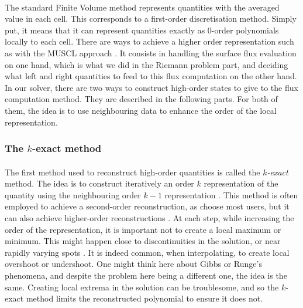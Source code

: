       \paragraph{}
      The standard Finite Volume method represents quantities with the averaged value in each cell.
      This corresponds to a first-order discretisation method.
      Simply put, it means that it can represent quantities exactly as 0-order polynomials locally to each cell.
      There are ways to achieve a higher order representation such as with the MUSCL approach \cite{VanLeer1979}.
      It consists in handling the surface flux evaluation on one hand, which is what we did in the Riemann problem part, and deciding what left and right quantities to feed to this flux computation on the other hand.
      In our solver, there are two ways to construct high-order states to give to the flux computation method.
      They are described in the following parts.
      For both of them, the idea is to use neighbouring data to enhance the order of the local representation.


      \subsubsection{The $k$-exact method}

        \paragraph{}
        The first method used to reconstruct high-order quantities is called the \emph{$k$-exact} method.
        The idea is to construct iteratively an order $k$ representation of the quantity using the neighbouring order $k-1$ representation \cite{HaiderCroisilleCourbet2009}.
        This method is often employed to achieve a second-order reconstruction, as choose most users, but it can also achieve higher-order reconstructions \cite{HaiderCroisilleCourbet2011, HaiderCourbetCroisille2018, PontBrennerCinellaEtAl2017}.
        At each step, while increasing the order of the representation, it is important not to create a local maximum or minimum.
        This might happen close to discontinuities in the solution, or near rapidly varying spots .
        It is indeed common, when interpolating, to create local overshoot or undershoot.
        One might think here about Gibbs or Runge's phenomena, and despite the problem here being a different one, the idea is the same.
        Creating local extrema in the solution can be troublesome, and so the $k$-exact method limits the reconstructed polynomial to ensure it does not.


